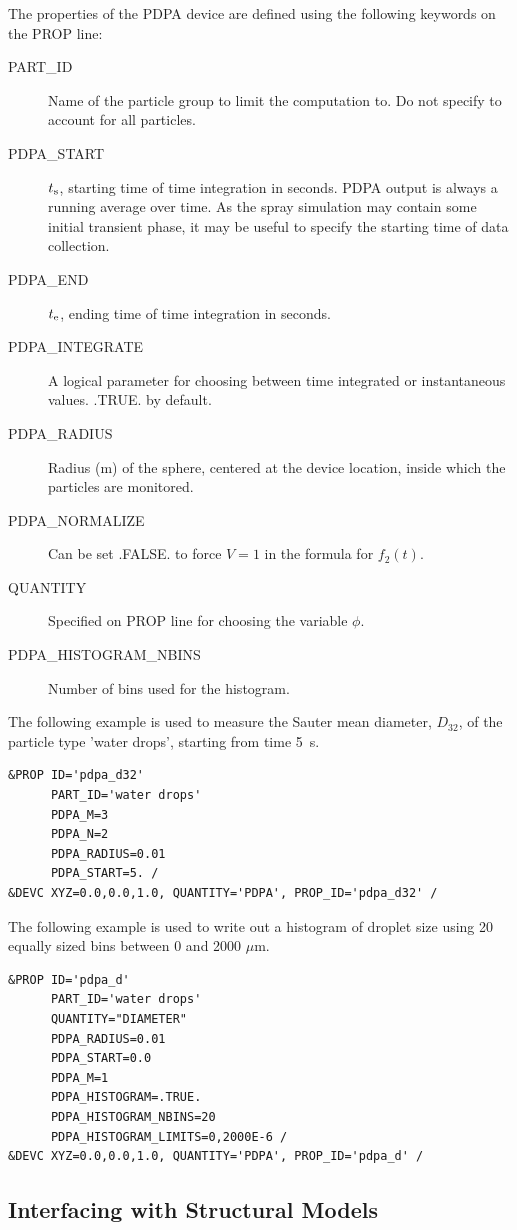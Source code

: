 \documentclass[11pt]{book}
\begin{document}
The properties of the PDPA device are defined using the following keywords on the {\ct PROP} line:
\begin{description}
\item[{\ct PART\_ID}] Name of the particle group to limit the computation to. Do not specify to account for all particles.
\item[{\ct PDPA\_START}] $t_{\rm s}$, starting time of time integration in seconds. PDPA output is always a running average over time. As the spray simulation may contain some initial transient phase, it may be useful to specify the starting time of data collection.
\item[{\ct PDPA\_END}] $t_{\rm e}$, ending time of time integration in seconds.
\item[{\ct PDPA\_INTEGRATE}] A logical parameter for choosing between time integrated or instantaneous values. {\ct .TRUE.} by default.
\item[{\ct PDPA\_RADIUS}] Radius (m) of the sphere, centered at the device location, inside which the particles are monitored.
\item[{\ct PDPA\_NORMALIZE}] Can be set {\ct .FALSE.} to force $V = 1$ in the formula for $f_2(t)$.
\item[{\ct QUANTITY}] Specified on {\ct PROP} line for choosing the variable $\phi$.
\item[{\ct PDPA\_HISTOGRAM\_NBINS}] Number of bins used for the histogram.
\end{description}
The following example is used to measure the Sauter mean diameter, $D_{32}$, of the particle type {\ct 'water drops'}, starting from time 5~s.
\begin{lstlisting}
&PROP ID='pdpa_d32'
      PART_ID='water drops'
      PDPA_M=3
      PDPA_N=2
      PDPA_RADIUS=0.01
      PDPA_START=5. /
&DEVC XYZ=0.0,0.0,1.0, QUANTITY='PDPA', PROP_ID='pdpa_d32' /
\end{lstlisting}
The following example is used to write out a histogram of droplet size using 20 equally sized bins between 0 and 2000 $\mu$m.
\begin{lstlisting}
&PROP ID='pdpa_d'
      PART_ID='water drops'
      QUANTITY="DIAMETER"
      PDPA_RADIUS=0.01
      PDPA_START=0.0
      PDPA_M=1
      PDPA_HISTOGRAM=.TRUE.
      PDPA_HISTOGRAM_NBINS=20
      PDPA_HISTOGRAM_LIMITS=0,2000E-6 /
&DEVC XYZ=0.0,0.0,1.0, QUANTITY='PDPA', PROP_ID='pdpa_d' /
\end{lstlisting}




\subsection{Interfacing with Structural Models}
\label{info:AST}
\end{document}
